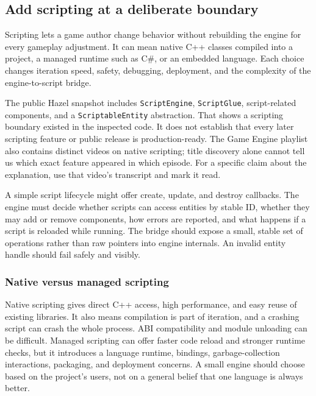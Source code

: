 \subsection{Add scripting at a deliberate boundary}\label{06-engine-ii-ch040-add-scripting-at-a-deliberate-boundary}

\hypertarget{06-engine-ii-ch040-add-scripting-at-a-deliberate-boundary}{}

Scripting lets a game author change behavior without rebuilding the engine for every gameplay adjustment. It can mean native C++ classes compiled into a project, a managed runtime such as C\#, or an embedded language. Each choice changes iteration speed, safety, debugging, deployment, and the complexity of the engine-to-script bridge.

The public Hazel snapshot includes \texttt{ScriptEngine}, \texttt{ScriptGlue}, script-related components, and a \texttt{ScriptableEntity} abstraction. That shows a scripting boundary existed in the inspected code. It does not establish that every later scripting feature or public release is production-ready. The Game Engine playlist also contains distinct videos on native scripting; title discovery alone cannot tell us which exact feature appeared in which episode. For a specific claim about the explanation, use that video's transcript and mark it read.

A simple script lifecycle might offer create, update, and destroy callbacks. The engine must decide whether scripts can access entities by stable ID, whether they may add or remove components, how errors are reported, and what happens if a script is reloaded while running. The bridge should expose a small, stable set of operations rather than raw pointers into engine internals. An invalid entity handle should fail safely and visibly.

\subsubsection{Native versus managed scripting}\label{06-engine-ii-ch040-native-versus-managed-scripting}

\hypertarget{06-engine-ii-ch040-native-versus-managed-scripting}{}

Native scripting gives direct C++ access, high performance, and easy reuse of existing libraries. It also means compilation is part of iteration, and a crashing script can crash the whole process. ABI compatibility and module unloading can be difficult. Managed scripting can offer faster code reload and stronger runtime checks, but it introduces a language runtime, bindings, garbage-collection interactions, packaging, and deployment concerns. A small engine should choose based on the project's users, not on a general belief that one language is always better.

